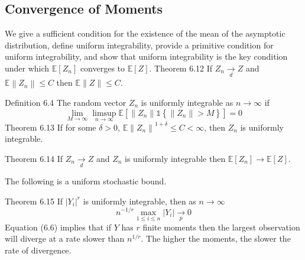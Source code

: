 \documentclass[10pt]{article}
\begin{document}
\subsection{Convergence of Moments}
We give a sufficient condition for the existence of the mean of the asymptotic distribution, define uniform integrability, provide a primitive condition for uniform integrability, and show that uniform integrability is the key condition under which $\mathbb{E}\left[Z_{n}\right]$ converges to $\mathbb{E}[Z]$. Theorem 6.12 If $Z_{n} \underset{d}{\longrightarrow} Z$ and $\mathbb{E}\left\|Z_{n}\right\| \leq C$ then $\mathbb{E}\|Z\| \leq C$.

Definition 6.4 The random vector $Z_{n}$ is uniformly integrable as $n \rightarrow \infty$ if
$$
\lim _{M \rightarrow \infty} \limsup _{n \rightarrow \infty} \mathbb{E}\left[\left\|Z_{n}\right\| \mathbb{1}\left\{\left\|Z_{n}\right\|>M\right\}\right]=0
$$
Theorem 6.13 If for some $\delta>0$, $\mathbb{E}\left\|Z_{n}\right\|^{1+\delta} \leq C<\infty$, then $Z_{n}$ is uniformly integrable.

Theorem 6.14 If $Z_{n} \underset{d}{\longrightarrow} Z$ and $Z_{n}$ is uniformly integrable then $\mathbb{E}\left[Z_{n}\right] \longrightarrow \mathbb{E}[Z]$.

The following is a uniform stochastic bound.

Theorem 6.15 If $\left|Y_{i}\right|^{r}$ is uniformly integrable, then as $n \rightarrow \infty$
$$
n^{-1 / r} \max _{1 \leq i \leq n}\left|Y_{i}\right| \underset{p}{\longrightarrow} 0
$$
Equation (6.6) implies that if $Y$ has $r$ finite moments then the largest observation will diverge at a rate slower than $n^{1 / r}$. The higher the moments, the slower the rate of divergence.
\end{document}
